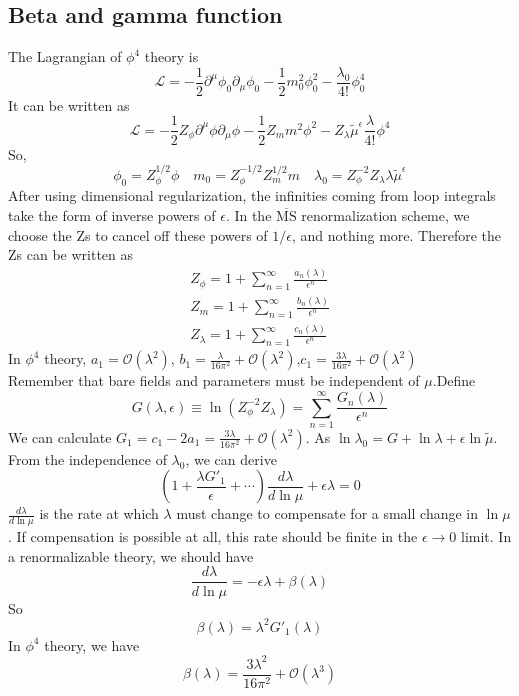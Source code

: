 \subsection{Beta and gamma function}
\noindent
The Lagrangian of $\phi^4$ theory is 
\[\mathcal{L} = -\frac{1}{2} \partial^{\mu} \phi_0 \partial_{\mu} \phi_0 -\frac{1}{2}m_0^2 \phi_0^2 - \frac{\lambda_0}{4!}\phi_0^4\]
It can be written as
\[\mathcal{L} = -\frac{1}{2}Z_{\phi} \partial^{\mu} \phi \partial_{\mu} \phi -\frac{1}{2}Z_{m}m^2 \phi^2 - Z_{\lambda} \tilde{\mu}^{\epsilon}\frac{\lambda}{4!}\phi^4\]
So, 
\[\phi_0 = Z_{\phi}^{1/2}\phi \quad m_0 = Z_{\phi}^{-1/2} Z_{m}^{1/2}m \quad \lambda_0 = Z_{\phi}^{-2} Z_{\lambda} \lambda \tilde{\mu}^{\epsilon}\]
After using dimensional regularization, the infinities coming from loop integrals take the form of inverse powers of $\epsilon$. In the  $\mathrm{\overline{MS}}$ renormalization scheme, we choose the Zs to cancel off these powers of $1/\epsilon$, and nothing more. Therefore the Zs can be written as
\begin{eqnarray}
Z_{\phi} = 1 + \sum_{n=1}^{\infty} \frac{a_n(\lambda)}{\epsilon^n} \nonumber \\
Z_{m} = 1 + \sum_{n=1}^{\infty} \frac{b_n(\lambda)}{\epsilon^n} \nonumber \\
Z_{\lambda} = 1 + \sum_{n=1}^{\infty} \frac{c_n(\lambda)}{\epsilon^n} \nonumber 
\end{eqnarray}
In $\phi^4$ theory, $a_1 = \mathcal{O}(\lambda^2)$, $b_1 = \frac{\lambda}{16\pi^2} +  \mathcal{O}(\lambda^2)$,$c_1 = \frac{3\lambda}{16\pi^2} + \mathcal{O}(\lambda^2)$\\
Remember that bare fields and parameters must be independent of $\mu$.Define
\[G(\lambda,\epsilon) \equiv \ln(Z_{\phi}^{-2} Z_{\lambda}) = \sum_{n=1}^{\infty} \frac{G_n(\lambda)}{\epsilon^n}\]
We can calculate $G_1 = c_1 - 2a_1 = \frac{3\lambda}{16\pi^2} + \mathcal{O}(\lambda^2)$.
As $\ln \lambda_0 = G + \ln \lambda + \epsilon \ln \tilde{\mu} $. From the independence of $\lambda_0$, we can derive
\[\left ( 1 + \frac{\lambda G'_1}{\epsilon} + \cdots \right) \frac{d\lambda}{d\ln \mu} + \epsilon \lambda = 0\]
$\frac{d\lambda}{d\ln\mu}$ is the rate at which $\lambda$ must change to compensate for a small change in $\ln \mu$. If compensation is possible at all, this rate should be finite in the $\epsilon \to 0$ limit. In a renormalizable theory, we should have
\[\frac{d\lambda}{d\ln\mu} = -\epsilon\lambda + \beta(\lambda)\]
So
\[\beta(\lambda) = \lambda^2 G'_1(\lambda)\]
In $\phi^4$ theory, we have
\[\beta(\lambda) = \frac{3\lambda^2}{16\pi^2} + \mathcal{O}(\lambda^3)\]
